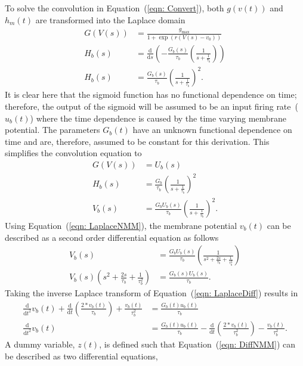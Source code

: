 To solve the convolution in Equation~(\ref{eqn: Convert}), both $g(v(t))$ and $h_{m}(t)$ are transformed into the Laplace domain \begin{align}%
\label{eqn: Laplace}
G(V(s)) &= \frac{g_{\mathrm{max}}}{1+\exp(r(V(s)-v_{0}))}\\
H_{b}(s) &= \frac{\mathrm{d}}{\mathrm{d}s}\left(-\frac{G_{b}(s)}{\tau_{b}}\left(\frac{1}{s+\frac{1}{\tau_{b}}}\right)\right)\\
H_{b}(s) &= \frac{G_{b}(s)}{\tau_{b}}\left(\frac{1}{s+\frac{1}{\tau_{b}}}\right)^2.
\end{align} It is clear here that the sigmoid function has no functional dependence on time; therefore, the output of the sigmoid will be assumed to be an input firing rate~($u_{b}(t)$) where the time dependence is caused by the time varying membrane potential. The parameters $G_b(t)$ have an unknown functional dependence on time and are, therefore, assumed to be constant for this derivation. This simplifies the convolution equation to \begin{align}%
G(V(s)) &= U_{b}(s)\\
H_{b}(s) &= \frac{G_{b}}{\tau_{b}}\left(\frac{1}{s+\frac{1}{\tau_{b}}}\right)^2\\
\label{eqn: LaplaceNMM}
V_{b}(s) &= \frac{G_{b}U_{b}(s)}{\tau_{b}}\left(\frac{1}{s+\frac{1}{\tau_{b}}}\right)^2.
\end{align} Using Equation~(\ref{eqn: LaplaceNMM}), the membrane potential $v_{b}(t)$ can be described as a second order differential equation as follows \begin{align}%
V_{b}(s) &= \frac{G_{b}U_{b}(s)}{\tau_{b}}\left(\frac{1}{s^2+\frac{2s}{\tau_{b}}+\frac{1}{\tau^2_{b}}}\right)\\
\label{eqn: LaplaceDiff}
V_{b}(s)\left(s^2+\frac{2s}{\tau_{b}}+\frac{1}{\tau^2_{b}}\right) &= \frac{G_{b}(s)U_{b}(s)}{\tau_{b}}.
\end{align} Taking the inverse Laplace transform of Equation~(\ref{eqn: LaplaceDiff}) results in \begin{align} %
\frac{\mathrm{d}}{\mathrm{d}t^2}v_{b}(t) + \frac{\mathrm{d}}{\mathrm{d}t}\left(\frac{2*v_{b}(t)}{\tau_{b}}\right) + \frac{v_{b}(t)}{\tau^2_{b}} &= \frac{G_{b}(t)u_{b}(t)}{\tau_{b}}\\
\label{eqn: DiffNMM}
\frac{\mathrm{d}}{\mathrm{d}t^2}v_{b}(t) &= \frac{G_{b}(t)u_{b}(t)}{\tau_{b}} - \frac{\mathrm{d}}{\mathrm{d}t}\left(\frac{2*v_{b}(t)}{\tau^2_{b}}\right) -\frac{v_{b}(t)}{\tau^2_{b}}. \end{align} A dummy  variable, $z(t)$, is defined such that Equation~(\ref{eqn: DiffNMM}) can be described as two differential equations, \begin{align} %

\end{align}
